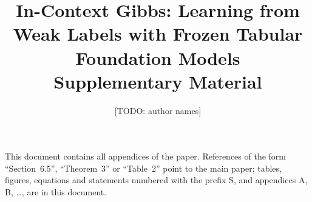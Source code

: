 \documentclass[10pt,journal,compsoc,onecolumn]{IEEEtran}
\newcommand{\todo}[1]{\textcolor{BrickRed}{\sffamily\small[TODO: #1]}}
\begin{document}
\title{In-Context Gibbs: Learning from Weak Labels with Frozen Tabular Foundation Models\\
\large Supplementary Material}
\author{\todo{author names}}
\maketitle

\noindent This document contains all appendices of the paper. References of the form ``Section~6.5'', ``Theorem~3''
or ``Table~2'' point to the main paper; tables, figures, equations and statements numbered with the prefix S, and
appendices A, B, \dots, are in this document.

\appendices
{}




\end{document}
